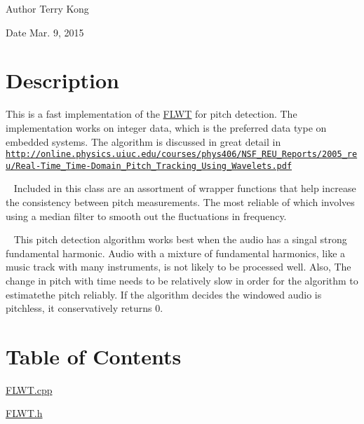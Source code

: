 \begin{DoxyAuthor}{Author}
Terry Kong 
\end{DoxyAuthor}
\begin{DoxyDate}{Date}
Mar. 9, 2015
\end{DoxyDate}
\hypertarget{index_desc_sec}{}\section{Description}\label{index_desc_sec}
This is a fast implementation of the \hyperlink{class_f_l_w_t}{F\+L\+W\+T} for pitch detection. The implementation works on integer data, which is the preferred data type on embedded systems. The algorithm is discussed in great detail in \href{http://online.physics.uiuc.edu/courses/phys406/NSF_REU_Reports/2005_reu/Real-Time_Time-Domain_Pitch_Tracking_Using_Wavelets.pdf}{\tt http\+://online.\+physics.\+uiuc.\+edu/courses/phys406/\+N\+S\+F\+\_\+\+R\+E\+U\+\_\+\+Reports/2005\+\_\+reu/\+Real-\/\+Time\+\_\+\+Time-\/\+Domain\+\_\+\+Pitch\+\_\+\+Tracking\+\_\+\+Using\+\_\+\+Wavelets.\+pdf}

~\newline
 Included in this class are an assortment of wrapper functions that help increase the consistency between pitch measurements. The most reliable of which involves using a median filter to smooth out the fluctuations in frequency.

~\newline
 This pitch detection algorithm works best when the audio has a singal strong fundamental harmonic. Audio with a mixture of fundamental harmonics, like a music track with many instruments, is not likely to be processed well. Also, The change in pitch with time needs to be relatively slow in order for the algorithm to estimatethe pitch reliably. If the algorithm decides the windowed audio is pitchless, it conservatively returns 0.\hypertarget{index_contents_sec}{}\section{Table of Contents}\label{index_contents_sec}
\hyperlink{_f_l_w_t_8cpp}{F\+L\+W\+T.\+cpp}

\hyperlink{_f_l_w_t_8h}{F\+L\+W\+T.\+h} 